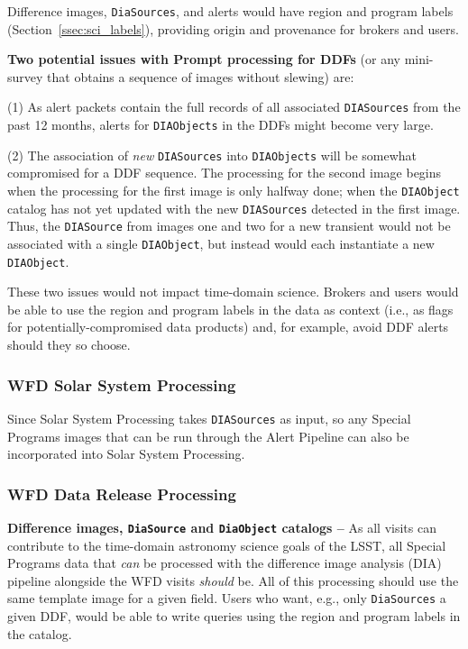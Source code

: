 Difference images, {\tt DiaSources}, and alerts would have region and program labels (Section~\ref{ssec:sci_labels}), providing origin and
provenance for brokers and users.

\textbf{Two potential issues with Prompt processing for DDFs}
(or any mini-survey that obtains a sequence of images without slewing)
are:

(1) As alert packets contain the full records of all associated 
{\tt DIASources} from the past 12 months, alerts for {\tt DIAObjects} in 
the DDFs might become very large.

(2) The association of {\it new} {\tt DIASources} into {\tt DIAObjects} 
will be somewhat compromised for a DDF sequence.
The processing for the second image begins when the processing for the 
first image is only halfway done; when the {\tt DIAObject} catalog has 
not yet updated with the new {\tt DIASources} detected in the first image.
Thus, the {\tt DIASource} from images one and two for a new transient 
would not be associated with a single {\tt DIAObject}, but instead would 
each instantiate a new {\tt DIAObject}.

These two issues would not impact time-domain science.
Brokers and users would be able to use the region and program labels
in the data as context (i.e., as flags for potentially-compromised 
data products) and, for example, avoid DDF alerts should they so choose.


\subsubsection{WFD Solar System Processing}

Since Solar System Processing takes \texttt{DIASources} as input, so any 
Special Programs images that can be run through the Alert Pipeline can 
also be incorporated into Solar System Processing.


\subsubsection{WFD Data Release Processing}

\textbf{Difference images, {\tt DiaSource} and {\tt DiaObject} catalogs -- }
As all visits can contribute to the time-domain astronomy science goals 
of the LSST, all Special Programs data that {\it can} be processed with 
the difference image analysis (DIA) pipeline alongside the WFD visits 
{\it should} be.
All of this processing should use the same template image for a given
field.
Users who want, e.g., only {\tt DiaSources} a given DDF, would be 
able to write queries using the region and program labels in the catalog.

